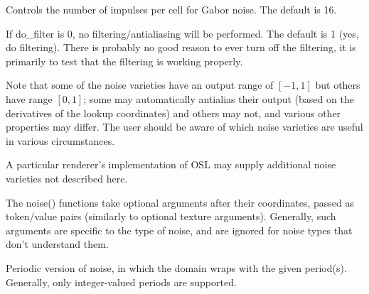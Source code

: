 \documentclass[11pt,letterpaper]{book}
\begin{document}
\vspace{12pt}
Controls the number of impulses per cell for Gabor noise.
The default is 16.
\apiend
\vspace{-16pt}

\vspace{12pt}
If {\cf do_filter} is 0, no filtering/antialiasing will
be performed.  The default is 1 (yes, do filtering).  There is probably
no good reason to ever turn off the filtering, it is primarily to test
that the filtering is working properly.
\apiend
\vspace{-16pt}

\apiend


Note that some of the noise varieties have an output range of $[-1,1]$
but others have range $[0,1]$; some may automatically antialias their
output (based on the derivatives of the lookup coordinates) and others
may not, and various other properties may differ.  The user should be
aware of which noise varieties are useful in various circumstances.

A particular renderer's implementation of OSL may supply additional
noise varieties not described here.

The {\cf noise()} functions take optional arguments after their
coordinates, passed as token/value pairs (similarly to optional texture
arguments).  Generally, such arguments are specific to the type of
noise, and are ignored for noise types that don't understand them.

\apiend




Periodic version of {\cf noise}, in which the domain wraps with the given
period(s).  Generally, only integer-valued periods are supported.
\apiend




\end{document}
